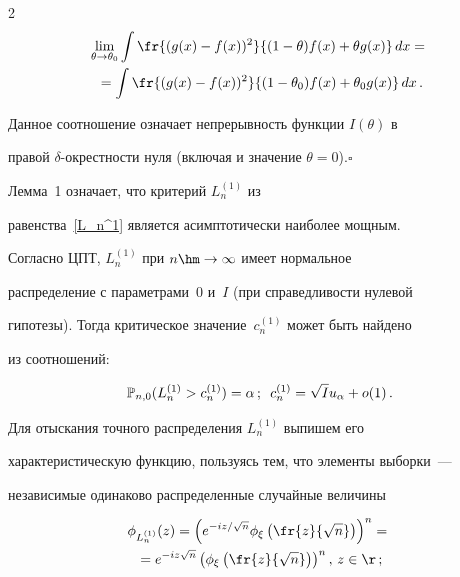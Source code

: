 \begin{multicols}{2}
\begin{multline*}
\lim\limits_{\theta\to\theta_0}\int\fr{(g(x)-f(x))^2}{(1-\theta)

f(x)+\theta

g(x)}\,dx={}\\

{}=\int\fr{(g(x)-f(x))^2}{(1-\theta_0)

f(x)+\theta_0 g(x)}\,dx\,.

\end{multline*}

Данное соотношение означает непрерывность функции $I(\theta)$ в

правой $\delta$-окрест\-ности нуля (включая и значение $\theta=0$).\hfill$\square$



\medskip



Лемма~1 означает, что критерий $L_n^{(1)}$ из

равенства~\eqref{L_n^1} является асимптотически наиболее мощным.

Согласно ЦПТ, $L_n^{(1)}$ при $n\hm\rightarrow\infty$ имеет нормальное

распределение с параметрами~$0$ и~$I$ (при справедливости нулевой

гипотезы). Тогда критическое значение~$c^{(1)}_n$ может быть найдено

из соотношений:

$$

\Pr_{n,0}(L_n^{(1)}>c^{(1)}_n)=\alpha\,;\enskip 

c^{(1)}_n=\sqrt{I}u_\alpha+o(1)\,.

$$



Для отыскания точного распределения $L_n^{(1)}$ выпишем его

характеристическую функцию, пользуясь тем, что элементы выборки~---

независимые одинаково распределенные случайные величины

\begin{multline}

\label{Xf}\phi_{L_n^{(1)}}(z)=\left(e^{-iz/\sqrt{n}}\phi_\xi\left(\fr{z}{\sqrt

n}\right)\right)^n={}\\

{}=e^{-iz\sqrt{n}}\left(\phi_\xi\left(

\fr {z}{\sqrt n}\right)\right)^n,\,z\in\r\,;

\end{multline}




\end{multicols}
